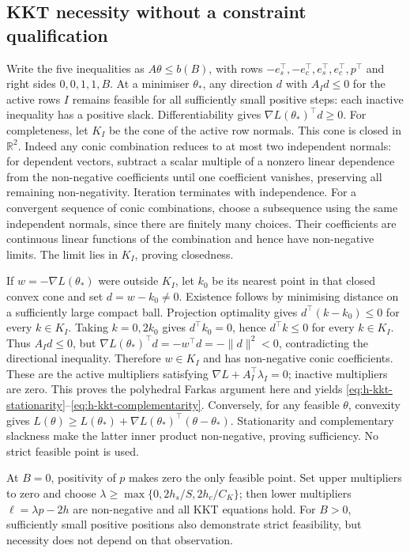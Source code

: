 \documentclass[11pt]{article}
\begin{document}
\subsection{KKT necessity without a constraint qualification}

Write the five inequalities as $A\theta\leq b(B)$, with rows
$-e_s^\top,-e_c^\top,e_s^\top,e_c^\top,p^\top$ and right sides
$0,0,1,1,B$. At a minimiser $\theta_*$, any direction $d$ with
$A_Id\leq0$ for the active rows $I$ remains feasible for all sufficiently
small positive steps: each inactive inequality has a positive slack.
Differentiability gives $\nabla L(\theta_*)^\top d\geq0$.
For completeness, let $K_I$ be the cone of the active row normals.
This cone is closed in $\mathbb R^2$. Indeed any conic combination
reduces to at most two independent normals: for dependent vectors,
subtract a scalar multiple of a nonzero linear dependence from the
non-negative coefficients until one coefficient vanishes, preserving
all remaining non-negativity. Iteration terminates with independence.
For a convergent sequence of conic combinations, choose a subsequence
using the same independent normals, since there are finitely many
choices. Their coefficients are continuous linear functions of the
combination and hence have non-negative limits. The limit lies in
$K_I$, proving closedness.

If $w=-\nabla L(\theta_*)$ were outside $K_I$, let $k_0$ be its
nearest point in that closed convex cone and set $d=w-k_0\ne0$.
Existence follows by minimising distance on a sufficiently large compact ball.
Projection optimality gives $d^\top(k-k_0)\leq0$ for every $k\in K_I$.
Taking $k=0,2k_0$ gives $d^\top k_0=0$, hence $d^\top k\leq0$
for every $k\in K_I$. Thus $A_Id\leq0$, but
$\nabla L(\theta_*)^\top d=-w^\top d=-\|d\|^2<0$,
contradicting the directional inequality. Therefore $w\in K_I$
and has non-negative conic coefficients. These are the active
multipliers satisfying $\nabla L+A_I^\top\lambda_I=0$; inactive
multipliers are zero. This proves the polyhedral Farkas argument here
and yields \eqref{eq:h-kkt-stationarity}--\eqref{eq:h-kkt-complementarity}.
Conversely, for any feasible $\theta$, convexity gives
$L(\theta)\geq L(\theta_*)+\nabla L(\theta_*)^\top(\theta-\theta_*)$.
Stationarity and complementary slackness make the latter inner product
non-negative, proving sufficiency. No strict feasible point is used.

At $B=0$, positivity of $p$ makes zero the only feasible point.
Set upper multipliers to zero and choose
$\lambda\geq\max\{0,2h_s/S,2h_c/C_K\}$; then lower multipliers
$\ell=\lambda p-2h$ are non-negative and all KKT equations hold.
For $B>0$, sufficiently small positive positions also demonstrate
strict feasibility, but necessity does not depend on that observation.
\end{document}
